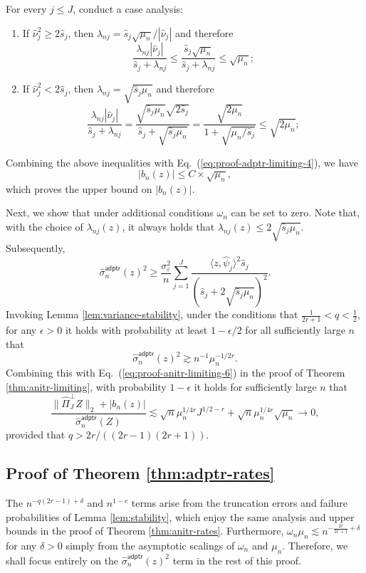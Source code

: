 \documentclass[11pt,a4paper]{article}
\renewcommand{\hat}{\widehat}
\theoremstyle{definition}
\theoremstyle{plain}
\theoremstyle{remark}
\newcommand{\adptr}{\mathsf{adptr}}
\newcommand{\pd}[1]{
	{ \color{blue} PD: #1}
}
\begin{document}
For every $j\leq J$, conduct a case analysis: 
\begin{enumerate}
\item If $\hat\nu_j^2\geq 2\hat s_j$, then $\lambda_{nj}=\hat s_j\sqrt{\mu_n}/|\hat\nu_j|$ and therefore
$$
\frac{\lambda_{nj}|\hat\nu_j|}{\hat s_j+\lambda_{nj}}\leq \frac{\hat s_j\sqrt{\mu_n}}{\hat s_j+\lambda_{nj}}\leq \sqrt{\mu_n};
$$
\item If $\hat\nu_j^2< 2\hat s_j$, then $\lambda_{nj}=\sqrt{\hat s_j\mu_n}$ and therefore
$$
\frac{\lambda_{nj}|\hat\nu_j|}{\hat s_j+\lambda_{nj}} = \frac{\sqrt{\hat s_j\mu_n}\sqrt{2\hat s_j}}{\hat s_j+\sqrt{\hat s_j\mu_n}} = \frac{\sqrt{2\mu_n}}{1+\sqrt{\mu_n/\hat s_j}}\leq \sqrt{2\mu_n};
$$
\end{enumerate}
Combining the above inequalities with Eq.~(\ref{eq:proof-adptr-limiting-4}), we have
$$
\big|b_n(z)\big| \leq C\times  \sqrt{\mu_n},
$$
which proves the upper bound on $|b_n(z)|$.

Next, we show that under additional conditions $\omega_n$ can be set to zero. Note that, with the choice of $\lambda_{nj}(z)$, it always holds that $\lambda_{nj}(z)\leq 2\sqrt{\hat s_j\mu_n}$.
Subsequently,
$$
\hat\sigma_n^\adptr(z)^2 \geq \frac{\sigma_\varepsilon^2}{n}\sum_{j=1}^J \frac{\langle z,\hat\psi_j\rangle^2\hat s_j}{(\hat s_j+2\sqrt{\hat s_j\mu_n})^2}.
$$
Invoking Lemma \ref{lem:variance-stability}, under the conditions that $\frac{1}{2r+1}<q<\frac{1}{2}$, for any $\epsilon>0$ it holds with probability at least $1-\epsilon/2$ for all sufficiently large $n$ that
$$
\hat\sigma_n^\adptr(z)^2 \gtrsim n^{-1}\mu_n^{-1/2r}.
$$
Combining this with Eq.~(\ref{eq:proof-anitr-limiting-6}) in the proof of Theorem \ref{thm:anitr-limiting}, with probability $1-\epsilon$ it holds for sufficiently large $n$ that
$$
\frac{\|\hat\Pi_J^\perp Z\|_2+|b_n(z)|}{\hat\sigma_n^\adptr(Z)} \lesssim \sqrt{n}\mu_n^{1/4r}J^{1/2-r} + \sqrt{n}\mu_n^{1/4r}\sqrt{\mu_n} \to 0,
$$
provided that $q>2r/((2r-1)(2r+1))$. 




\subsection{Proof of Theorem \ref{thm:adptr-rates}}

The $n^{-q(2r-1)+\delta}$ and $n^{1-c}$ terms arise from the truncation errors and failure probabilities of Lemma \ref{lem:stability}, which enjoy the same analysis and upper bounds
in the proof of Theorem \ref{thm:anitr-rates}.
Furthermore, $\omega_n\mu_n\lesssim n^{-\frac{2r}{2r+1}+\delta}$ for any $\delta>0$ simply from the asymptotic scalings of $\omega_n$ and $\mu_n$.
Therefore, we shall focus entirely on the $\hat\sigma_n^\adptr(z)^2$ term in the rest of this proof.
\end{document}
